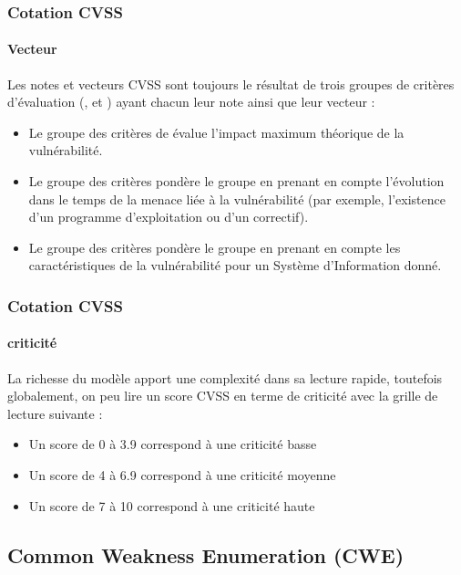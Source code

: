 \begin{frame}
\frametitle<presentation>{Cotation CVSS}
\framesubtitle<presentation>{Vecteur}
Les notes et vecteurs CVSS sont toujours le résultat de trois groupes de critères d'évaluation (,  et ) ayant chacun leur note ainsi que leur vecteur :
\begin{itemize}
  \item Le groupe des critères de\textbf{ } évalue l'impact maximum théorique de la vulnérabilité.
  \item Le groupe des critères\textbf{   }pondère le groupe  en prenant en compte  l'évolution dans le temps de la menace liée à la vulnérabilité  (par exemple, l'existence d'un programme d’exploitation ou d'un correctif).
  \item Le groupe des critères\textbf{  }pondère le groupe  en prenant en compte les caractéristiques de la vulnérabilité pour un Système d'Information donné.
\end{itemize}
\end{frame}

\begin{frame}
\frametitle<presentation>{Cotation CVSS}
\framesubtitle<presentation>{criticité}
La richesse du modèle apport une complexité dans sa lecture rapide, toutefois globalement, on peu lire un score CVSS en terme de criticité avec la grille de lecture suivante :

\begin{itemize}
  \item Un score de 0 à 3.9 correspond à une criticité basse
  \item Un score de 4 à 6.9 correspond à une criticité moyenne
  \item Un score de 7 à 10 correspond à une criticité haute
\end{itemize}
\end{frame}


\subsection{Common Weakness Enumeration (CWE)}

